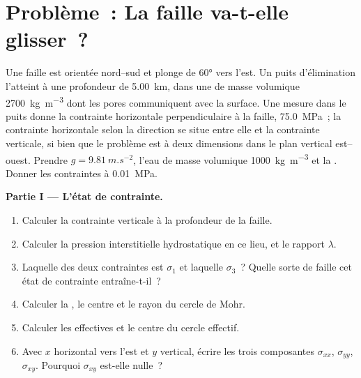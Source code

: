 \section{Problème~: La faille va-t-elle glisser~?}

\begin{problem}
\label{pb:b1:stress-strain-rheology:1}
Une faille est orientée nord--sud et plonge de \ang{60} vers l'est. Un puits d'élimination
l'atteint à une profondeur de \qty{5.00}{km}, dans une  de masse volumique
\qty{2700}{kg.m^{-3}} dont les pores communiquent avec la surface. Une mesure dans le
puits donne la contrainte horizontale perpendiculaire à la faille,
\qty{75.0}{MPa}~; la contrainte horizontale selon la direction se situe entre elle et
la contrainte verticale, si bien que le problème est à deux dimensions dans le plan vertical
est--ouest. Prendre $g = \qty{9.81}{m.s^{-2}}$, l'eau de masse volumique
\qty{1000}{kg.m^{-3}} et la . Donner les contraintes à
\qty{0.01}{MPa}.

\medskip
\noindent\textbf{Partie I --- L'état de contrainte.}
\begin{enumerate}
  \item Calculer la contrainte verticale à la profondeur de la faille.
  \item Calculer la pression interstitielle hydrostatique en ce lieu, et le rapport $\lambda$.
  \item Laquelle des deux contraintes est $\sigma_1$ et laquelle $\sigma_3$~? Quelle sorte
        de faille cet état de contrainte entraîne-t-il~?
  \item Calculer la , le centre et le rayon du
        cercle de Mohr.
  \item Calculer les  effectives et le centre du
        cercle effectif.
  \item Avec $x$ horizontal vers l'est et $y$ vertical, écrire les trois
        composantes $\sigma_{xx}$, $\sigma_{yy}$, $\sigma_{xy}$. Pourquoi
        $\sigma_{xy}$ est-elle nulle~?
\end{enumerate}


\end{problem}
